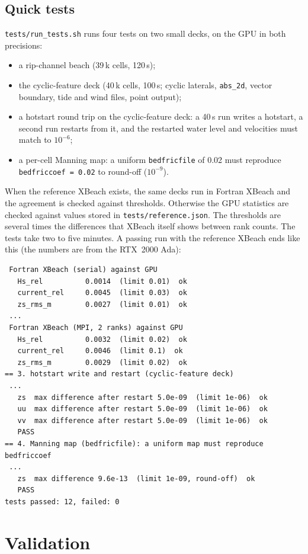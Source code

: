 \documentclass[11pt,a4paper]{article}
\newcommand{\code}[1]{\texttt{#1}}
\begin{document}
\subsection{Quick tests}
\code{tests/run\_tests.sh} runs four tests on two small decks, on the GPU in both precisions:
\begin{itemize}
\item a rip-channel beach (39\,k cells, 120\,s);
\item the cyclic-feature deck (40\,k cells, 100\,s; cyclic laterals, \code{abs\_2d}, vector boundary,
      tide and wind files, point output);
\item a hotstart round trip on the cyclic-feature deck: a 40\,s run writes a hotstart, a second run
      restarts from it, and the restarted water level and velocities must match to $10^{-6}$;
\item a per-cell Manning map: a uniform \code{bedfricfile} of 0.02 must reproduce \code{bedfriccoef = 0.02}
      to round-off ($10^{-9}$).
\end{itemize}
When the reference XBeach exists, the same decks run in Fortran XBeach and the agreement is checked
against thresholds. Otherwise the GPU statistics are checked against values stored in
\code{tests/reference.json}. The thresholds are several times the differences that XBeach itself shows
between rank counts.
The tests take two to five minutes. A passing run with the reference XBeach ends like this (the numbers
are from the RTX~2000 Ada):
\begin{lstlisting}
 Fortran XBeach (serial) against GPU
   Hs_rel          0.0014  (limit 0.01)  ok
   current_rel     0.0045  (limit 0.03)  ok
   zs_rms_m        0.0027  (limit 0.01)  ok
 ...
 Fortran XBeach (MPI, 2 ranks) against GPU
   Hs_rel          0.0032  (limit 0.02)  ok
   current_rel     0.0046  (limit 0.1)  ok
   zs_rms_m        0.0029  (limit 0.02)  ok
== 3. hotstart write and restart (cyclic-feature deck)
 ...
   zs  max difference after restart 5.0e-09  (limit 1e-06)  ok
   uu  max difference after restart 5.0e-09  (limit 1e-06)  ok
   vv  max difference after restart 5.0e-09  (limit 1e-06)  ok
   PASS
== 4. Manning map (bedfricfile): a uniform map must reproduce bedfriccoef
 ...
   zs  max difference 9.6e-13  (limit 1e-09, round-off)  ok
   PASS
tests passed: 12, failed: 0
\end{lstlisting}

\section{Validation}\label{sec:valid}
\end{document}
